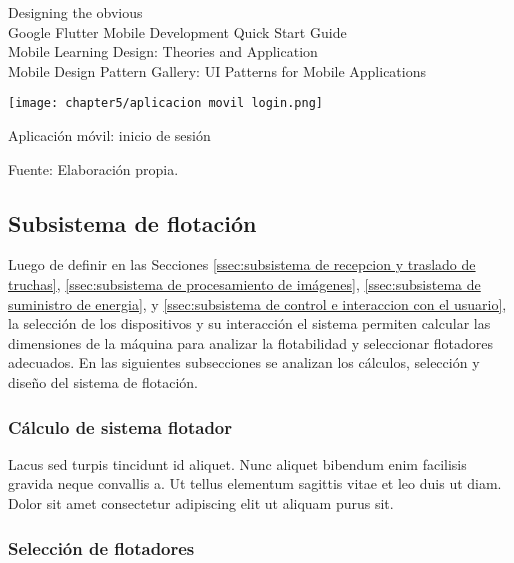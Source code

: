 Designing the obvious
\cite{Joekman2010} \\
Google Flutter Mobile Development Quick Start Guide
\cite{PrajyotMainkar2019} \\
Mobile Learning Design: Theories and Application
\cite{Churchill2016} \\
Mobile Design Pattern Gallery: UI Patterns for Mobile Applications
\cite{Neil2012}


\begin{myfigure}[H]
	\centering
	\texttt{[image: chapter5/aplicacion movil login.png]}
	\caption{Aplicación móvil: inicio de sesión}
	\begin{myflushleftportland}
		Fuente: Elaboración propia.
	\end{myflushleftportland}
	\label{fig:aplicacion movil login}
\end{myfigure}


\subsection{Subsistema de flotación}
\label{ssec:subsistema de flotacion}

Luego de definir en las Secciones \ref{ssec:subsistema de recepcion y traslado de truchas}, \ref{ssec:subsistema de procesamiento de imágenes}, \ref{ssec:subsistema de suministro de energia}, y \ref{ssec:subsistema de control e interaccion con el usuario}, la selección de los dispositivos y su interacción el sistema permiten calcular las dimensiones de la máquina para analizar la flotabilidad y seleccionar flotadores adecuados. En las siguientes subsecciones se analizan los cálculos, selección y diseño del sistema de flotación.

\subsubsection{Cálculo de sistema flotador}

Lacus sed turpis tincidunt id aliquet. Nunc aliquet bibendum enim facilisis gravida neque convallis a. Ut tellus elementum sagittis vitae et leo duis ut diam. Dolor sit amet consectetur adipiscing elit ut aliquam purus sit. 

\subsubsection{Selección de flotadores}

